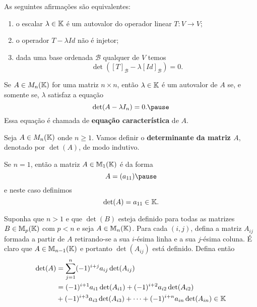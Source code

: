 \documentclass{beamer}
\begin{document}
    \begin{frame}
        \begin{teorema}
            As seguintes afirmações são equivalentes:\pause
            \begin{enumerate}[label={\roman*})]
                \item o escalar $\lambda \in \mathbb{K}$ \pause é um autovalor do operador linear $T \colon V \to V$;\pause

                \item o operador $T - \lambda Id$ \pause não é injetor;\pause

                \item dada uma base ordenada $\mathcal{B}$ \pause qualquer de $V$ temos\pause
                \[
                    \det([T]_\mathcal{B} - \lambda[Id]_\mathcal{B}) = 0.
                \]
            \end{enumerate}
        \end{teorema}
    \end{frame}

    \begin{frame}
        \begin{teorema}
            Se $A \in M_n(\mathbb{K})$ \pause for uma matriz $n \times n$, \pause então $\lambda \in \mathbb{K}$ é um autovalor de $A$ \pause se, e somente se, $\lambda$ satisfaz a equação\pause
            \[
                \det(A - \lambda I_n) = 0.\pause
            \]
            Essa equação é chamada de \textbf{equação característica} de $A$.
        \end{teorema}
    \end{frame}

    \begin{frame}
        Seja $A \in M_n(\mathbb{K})$ onde $n \ge 1$. \pause Vamos definir o \textbf{determinante da matriz $A$}, \pause denotado por $\det(A)$, \pause de modo indutivo.\pause

        Se $n = 1$, \pause então a matriz $A \in \mathbb{M}_1(\mathbb{K})$ \pause é da forma
        \[
            A = (a_{11})\pause
        \]
        e neste caso definimos\pause
        \[
            \det(A) = a_{11} \in \mathbb{K}.
        \]
    \end{frame}

\begin{frame}
        Suponha que $n > 1$ \pause e que $\det(B)$ \pause esteja definido para todas as matrizes $B \in \mathbb{M}_p(\mathbb{K})$ \pause com $p < n$ \pause e seja $A \in \mathbb{M}_n(\mathbb{K})$. \pause Para cada $(i,j)$, \pause defina a matriz $A_{ij}$ \pause formada a partir de $A$ \pause retirando-se a sua $i$-ésima linha \pause e a sua $j$-ésima coluna. \pause É claro que $A \in \mathbb{M}_{n - 1}(\mathbb{K})$ \pause e portanto $\det(A_{ij})$ \pause está definido. \pause Defina então\pause
        \begin{align*}
            \det(A) &= \sum_{j = 1}^n(-1)^{i + j}a_{ij}\det(A_{ij}) \\ &= (-1)^{i + 1}a_{i1}\det(A_{i1}) + (-1)^{i + 2}a_{i2}\det(A_{i2}) \\ & + (-1)^{i + 3}a_{i3}\det(A_{i3}) + \cdots + (-1)^{i + n}a_{in}\det(A_{in}) \in \mathbb{K}
        \end{align*}
    \end{frame}
\end{document}
